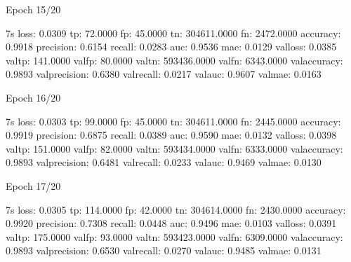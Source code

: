 \documentclass[letterpaper,10pt,english]{sphinxmanual}
\begin{document}
\begin{sphinxVerbatim}[commandchars=\\\{\}]
Epoch 15/20
\end{sphinxVerbatim}

\begin{sphinxVerbatim}[commandchars=\\\{\}]
 \PYGZhy{} 7s \PYGZhy{} loss: 0.0309 \PYGZhy{} tp: 72.0000 \PYGZhy{} fp: 45.0000 \PYGZhy{} tn: 304611.0000 \PYGZhy{} fn: 2472.0000 \PYGZhy{} accuracy: 0.9918 \PYGZhy{} precision: 0.6154 \PYGZhy{} recall: 0.0283 \PYGZhy{} auc: 0.9536 \PYGZhy{} mae: 0.0129 \PYGZhy{} val\PYGZus{}loss: 0.0385 \PYGZhy{} val\PYGZus{}tp: 141.0000 \PYGZhy{} val\PYGZus{}fp: 80.0000 \PYGZhy{} val\PYGZus{}tn: 593436.0000 \PYGZhy{} val\PYGZus{}fn: 6343.0000 \PYGZhy{} val\PYGZus{}accuracy: 0.9893 \PYGZhy{} val\PYGZus{}precision: 0.6380 \PYGZhy{} val\PYGZus{}recall: 0.0217 \PYGZhy{} val\PYGZus{}auc: 0.9607 \PYGZhy{} val\PYGZus{}mae: 0.0163
\end{sphinxVerbatim}

\begin{sphinxVerbatim}[commandchars=\\\{\}]
Epoch 16/20
\end{sphinxVerbatim}

\begin{sphinxVerbatim}[commandchars=\\\{\}]
 \PYGZhy{} 7s \PYGZhy{} loss: 0.0303 \PYGZhy{} tp: 99.0000 \PYGZhy{} fp: 45.0000 \PYGZhy{} tn: 304611.0000 \PYGZhy{} fn: 2445.0000 \PYGZhy{} accuracy: 0.9919 \PYGZhy{} precision: 0.6875 \PYGZhy{} recall: 0.0389 \PYGZhy{} auc: 0.9590 \PYGZhy{} mae: 0.0132 \PYGZhy{} val\PYGZus{}loss: 0.0398 \PYGZhy{} val\PYGZus{}tp: 151.0000 \PYGZhy{} val\PYGZus{}fp: 82.0000 \PYGZhy{} val\PYGZus{}tn: 593434.0000 \PYGZhy{} val\PYGZus{}fn: 6333.0000 \PYGZhy{} val\PYGZus{}accuracy: 0.9893 \PYGZhy{} val\PYGZus{}precision: 0.6481 \PYGZhy{} val\PYGZus{}recall: 0.0233 \PYGZhy{} val\PYGZus{}auc: 0.9469 \PYGZhy{} val\PYGZus{}mae: 0.0130
\end{sphinxVerbatim}

\begin{sphinxVerbatim}[commandchars=\\\{\}]
Epoch 17/20
\end{sphinxVerbatim}

\begin{sphinxVerbatim}[commandchars=\\\{\}]
 \PYGZhy{} 7s \PYGZhy{} loss: 0.0305 \PYGZhy{} tp: 114.0000 \PYGZhy{} fp: 42.0000 \PYGZhy{} tn: 304614.0000 \PYGZhy{} fn: 2430.0000 \PYGZhy{} accuracy: 0.9920 \PYGZhy{} precision: 0.7308 \PYGZhy{} recall: 0.0448 \PYGZhy{} auc: 0.9496 \PYGZhy{} mae: 0.0103 \PYGZhy{} val\PYGZus{}loss: 0.0391 \PYGZhy{} val\PYGZus{}tp: 175.0000 \PYGZhy{} val\PYGZus{}fp: 93.0000 \PYGZhy{} val\PYGZus{}tn: 593423.0000 \PYGZhy{} val\PYGZus{}fn: 6309.0000 \PYGZhy{} val\PYGZus{}accuracy: 0.9893 \PYGZhy{} val\PYGZus{}precision: 0.6530 \PYGZhy{} val\PYGZus{}recall: 0.0270 \PYGZhy{} val\PYGZus{}auc: 0.9485 \PYGZhy{} val\PYGZus{}mae: 0.0131
\end{sphinxVerbatim}
\end{document}
